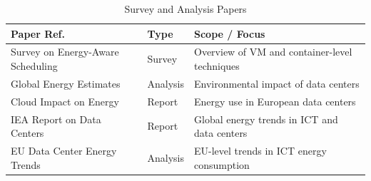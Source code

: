 \begin{table}[H]
\centering
\footnotesize
\begin{tabular}{|p{5.5cm}|p{3.5cm}|p{4cm}|}
\hline
\textbf{Paper Ref.} & \textbf{Type} & \textbf{Scope / Focus} \\
\hline
\cite{hameed_survey_2016} Survey on Energy-Aware Scheduling & Survey & Overview of VM and container-level techniques \\
\hline
\cite{masanet_2020} Global Energy Estimates & Analysis & Environmental impact of data centers \\
\hline
\cite{hintemann_2022} Cloud Impact on Energy & Report & Energy use in European data centers \\
\hline
\cite{IEADataCentres} IEA Report on Data Centers & Report & Global energy trends in ICT and data centers \\
\hline
\cite{avgerinou_trends_2017} EU Data Center Energy Trends & Analysis & EU-level trends in ICT energy consumption \\
\hline
\end{tabular}
\caption{Survey and Analysis Papers}
\label{tab:surveys}
\end{table}







